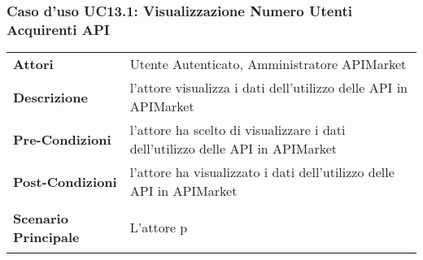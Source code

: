 \subsubsection{Caso d'uso UC13.1: Visualizzazione Numero Utenti Acquirenti API}
\label{UC13.1}

\renewcommand*{\arraystretch}{1.6}
\begin{longtable}{ l | p{11cm}}
	\hline
	\rowcolor{Gray}
	\multicolumn{2}{c}{UC13.1: Visualizzazione Numero Utenti} \\
	\hline
	\textbf{Attori} &Utente Autenticato, Amministratore APIMarket \\
	\textbf{Descrizione} & l'attore visualizza i dati dell'utilizzo delle API in APIMarket\\
	\textbf{Pre-Condizioni} & l'attore ha scelto di visualizzare i dati dell'utilizzo delle API in APIMarket\\
	\textbf{Post-Condizioni}&l'attore ha visualizzato i dati dell'utilizzo delle API in APIMarket\\
	\textbf{Scenario Principale} & \begin{enumerate*}[label=(\arabic*.),itemjoin={\newline}]
		\item L'attore p
	\end{enumerate*}\\
\end{longtable}


